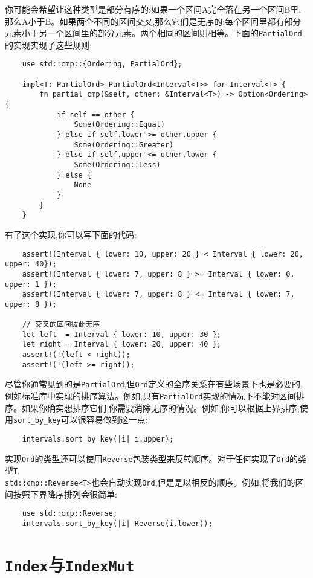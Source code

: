 你可能会希望让这种类型是部分有序的:如果一个区间A完全落在另一个区间B里,那么A小于B。如果两个不同的区间交叉,那么它们是无序的:每个区间里都有部分元素小于另一个区间里的部分元素。两个相同的区间则相等。下面的\texttt{PartialOrd}的实现实现了这些规则:
\begin{verbatim}
    use std::cmp::{Ordering, PartialOrd};

    impl<T: PartialOrd> PartialOrd<Interval<T>> for Interval<T> {
        fn partial_cmp(&self, other: &Interval<T>) -> Option<Ordering> {
            if self == other {
                Some(Ordering::Equal)
            } else if self.lower >= other.upper {
                Some(Ordering::Greater)
            } else if self.upper <= other.lower {
                Some(Ordering::Less)
            } else {
                None
            }
        }
    }
\end{verbatim}

有了这个实现,你可以写下面的代码:
\begin{verbatim}
    assert!(Interval { lower: 10, upper: 20 } < Interval { lower: 20, upper: 40});
    assert!(Interval { lower: 7, upper: 8 } >= Interval { lower: 0, upper: 1 });
    assert!(Interval { lower: 7, upper: 8 } <= Interval { lower: 7, upper: 8 });

    // 交叉的区间彼此无序
    let left  = Interval { lower: 10, upper: 30 };
    let right = Interval { lower: 20, upper: 40 };
    assert!(!(left < right));
    assert!(!(left >= right));
\end{verbatim}

尽管你通常见到的是\texttt{PartialOrd},但\texttt{Ord}定义的全序关系在有些场景下也是必要的,例如标准库中实现的排序算法。例如,只有\texttt{PartialOrd}实现的情况下不能对区间排序。如果你确实想排序它们,你需要消除无序的情况。例如,你可以根据上界排序,使用\texttt{sort\_by\_key}可以很容易做到这一点:
\begin{verbatim}
    intervals.sort_by_key(|i| i.upper);
\end{verbatim}

实现\texttt{Ord}的类型还可以使用\texttt{Reverse}包装类型来反转顺序。对于任何实现了\texttt{Ord}的类型\texttt{T},\\
\texttt{std::cmp::Reverse<T>}也会自动实现\texttt{Ord},但是是以相反的顺序。例如,将我们的区间按照下界降序排列会很简单:
\begin{verbatim}
    use std::cmp::Reverse;
    intervals.sort_by_key(|i| Reverse(i.lower));
\end{verbatim}

\section{\texttt{Index}与\texttt{IndexMut}}\label{index}

